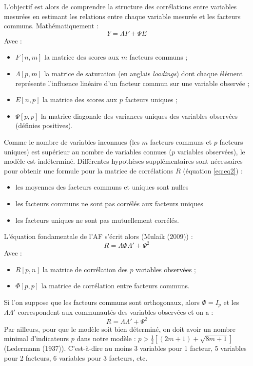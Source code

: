 \documentclass[12pt,a4paper]{reedthesis}
\providecommand{\tightlist}{%
  \setlength{\itemsep}{0pt}\setlength{\parskip}{0pt}}
\begin{document}
L'objectif est alors de comprendre la structure des corrélations entre variables mesurées en estimant les relations entre chaque variable mesurée et les facteurs communs. Mathématiquement :
\begin{equation} 
Y = \Lambda F + \Psi E
\label{eq:eq1}
\end{equation}
Avec :
\begin{itemize}
\tightlist
\item
  \(F[n, m]\) la matrice des scores aux \(m\) facteurs communs ;
\item
  \(\Lambda [p, m]\) la matrice de saturation (en anglais \emph{loadings}) dont chaque élément représente l'influence linéaire d'un facteur commun sur une variable observée ;
\item
  \(E[n, p]\) la matrice des scores aux \(p\) facteurs uniques ;
\item
  \(\Psi [p, p]\) la matrice diagonale des variances uniques des variables observées (définies positives).
\end{itemize}
Comme le nombre de variables inconnues (les \(m\) facteurs communs et \(p\) facteurs uniques) est supérieur au nombre de variables connues (\(p\) variables observées), le modèle est indéterminé. Différentes hypothèses supplémentaires sont nécessaires pour obtenir une formule pour la matrice de corrélations \(R\) (équation \eqref{eq:eq2}) :
\begin{itemize}
\tightlist
\item
  les moyennes des facteurs communs et uniques sont nulles
\item
  les facteurs communs ne sont pas corrélés aux facteurs uniques
\item
  les facteurs uniques ne sont pas mutuellement corrélés.
\end{itemize}
L'équation fondamentale de l'AF s'écrit alors (Mulaik (2009)) :
\begin{equation} 
R = \Lambda \Phi \Lambda' + \Psi^2
\label{eq:eq2}
\end{equation}
Avec :
\begin{itemize}
\tightlist
\item
  \(R[p, n]\) la matrice de corrélation des \(p\) variables observées ;
\item
  \(\Phi [p, p]\) la matrice de corrélation entre facteurs communs.
\end{itemize}
Si l'on suppose que les facteurs communs sont orthogonaux, alors \(\Phi=I_p\) et les \(\Lambda\Lambda'\) correspondent aux communautés des variables observées et on a :
\begin{equation} 
R = \Lambda \Lambda' + \Psi^2
\label{eq:eq3}
\end{equation}
Par ailleurs, pour que le modèle soit bien déterminé, on doit avoir un nombre minimal d'indicateurs \(p\) dans notre modèle : \(p > \frac{1}{2} [ (2m + 1) + \sqrt{8m + 1} ]\) (Ledermann (1937)). C'est-à-dire au moins 3 variables pour 1 facteur, 5 variables pour 2 facteurs, 6 variables pour 3 facteurs, etc.
\end{document}
